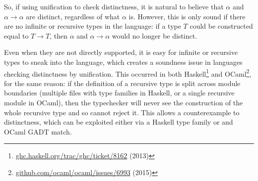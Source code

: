 \documentclass[11pt,oneside]{article}
\begin{document}
So, if using unification to check distinctness, it is natural to believe that \(α\) and \(α → α\) are distinct, regardless of what \(α\) is. However, this is only sound if there are no infinite or recursive types in the language: if a type \(T\) could be constructed equal to \(T → T\), then \(α\) and \(α → α\) would no longer be distinct.

Even when they are not directly supported, it is easy for infinite or recursive types to sneak into the language, which creates a soundness issue in languages checking distinctness by unification. This occurred in both Haskell\footnote{\href{https://ghc.haskell.org/trac/ghc/ticket/8162}{ghc.haskell.org/\allowbreak{}trac/\allowbreak{}ghc/\allowbreak{}ticket/\allowbreak{}8162} (2013)} and OCaml\footnote{\href{https://github.com/ocaml/ocaml/issues/6993}{github.com/\allowbreak{}ocaml/\allowbreak{}ocaml/\allowbreak{}issues/\allowbreak{}6993} (2015)}, for the same reason: if the definition of a recursive type is split across module boundaries (multiple files with type families in Haskell, or a single recursive module in OCaml), then the typechecker will never see the construction of the whole recursive type and so cannot reject it. This allows a counterexample to distinctness, which can be exploited either via a Haskell type family or and OCaml GADT match.
\end{document}
